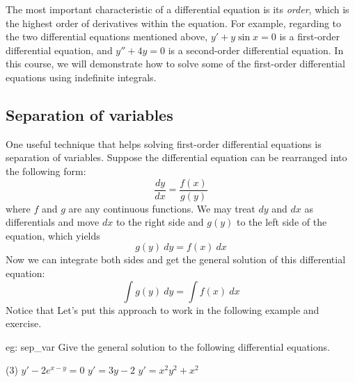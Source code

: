 The most important characteristic of a differential equation is its \textit{order}, which is the highest order of derivatives within the equation.  For example, regarding to the two differential equations mentioned above, $y' + y \sin x = 0$ is a first-order differential equation, and $y'' + 4y = 0$ is a second-order differential equation.  In this course, we will demonstrate how to solve some of the first-order differential equations using indefinite integrals.

\subsection{Separation of variables}
One useful technique that helps solving first-order differential equations is separation of variables.  Suppose the differential equation can be rearranged into the following form:
\[\frac{dy}{dx} = \frac{f(x)}{g(y)}\]
where $f$ and $g$ are any continuous functions.  We may treat $dy$ and $dx$ as differentials and move $dx$ to the right side and $g(y)$ to the left side of the equation, which yields
\[g(y)~dy = f(x)~dx\]
Now we can integrate both sides and get the general solution of this differential equation:
\[\int g(y)~dy = \int f(x)~dx\]
Notice that 
Let's put this approach to work in the following example and exercise.
\begin{eg}[]{eg: sep_var}
    Give the general solution to the following differential equations.
    \begin{tasks}(3)
        \task $y' - 2e^{x-y} = 0$
        \task $y' = 3y - 2$
        \task $y' = x^2y^2+x^2$
    \end{tasks}
\end{eg}

